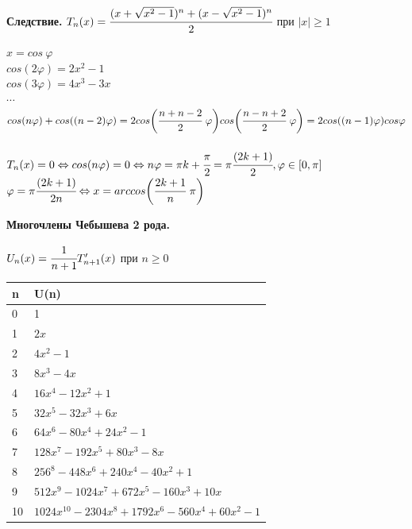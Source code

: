 \documentclass[12pt]{article}
\theoremstyle{definition}
\numberwithin{equation}{section}
\begin{document}
	\textbf{Следствие.}
	$T_n(x)=\cfrac{(x+\sqrt{x^2-1})^n+(x-\sqrt{x^2-1})^n}{2}$ при $ |x| \geqslant 1$
	\begin{center}
		$x=cos~\varphi$\\
		$cos(2\varphi)=2x^2-1$\\
		$cos(3\varphi)=4x^3-3x$\\
		$\cdots$\\
		$cos(n\varphi)+cos((n-2)\varphi)=2cos \bigg(\cfrac{n+n-2}{2}~\varphi \bigg)cos \bigg(\cfrac{n-n+2}{2}~\varphi \bigg)=2cos((n-1)\varphi)cos \varphi$\\
		~\\
		$T_n(x)=0 \Leftrightarrow cos(n\varphi)=0 \Leftrightarrow n\varphi=\pi k +\cfrac{\pi}{2}=\pi\cfrac{(2k+1)}{2}, \varphi \in [0, \pi]$\\
		$\varphi=\pi\cfrac{(2k+1)}{2n} \Leftrightarrow x=arccos \bigg(\cfrac{2k+1}{n}~\pi \bigg)$\end{center}
	\textbf{Многочлены Чебышева 2 рода.}
	\begin{center} $U_n(x)=\cfrac{1}{n+1}T_{n+1}'(x)$ при $ n \geqslant 0$\end{center}
	\begin{center}
		\begin{tabular}{|l|l|}
			\hline
			\textbf{n} & \textbf{U(n)} \\ \hline
			0 & 1 \\ \hline
			1 & $2x$ \\ \hline
			2 & $4x^2-1$ \\ \hline
			3 & $8x^3-4x$ \\ \hline
			4 & $16x^4-12x^2+1$ \\ \hline
			5 & $32x^5-32x^3+6x$ \\ \hline
			6 & $64x^6-80x^4+24x^2-1$ \\ \hline
			7 & $128x^7-192x^5+80x^3-8x$ \\ \hline
			8 & $256^8-448x^6+240x^4-40x^2+1$ \\ \hline
			9 & $512x^9-1024x^7+672x^5-160x^3+10x$ \\ \hline
			10 & $1024x^{10}-2304x^8+1792x^6-560x^4+60x^2-1$ \\ \hline
		\end{tabular}
	\end{center} 
\end{document}
